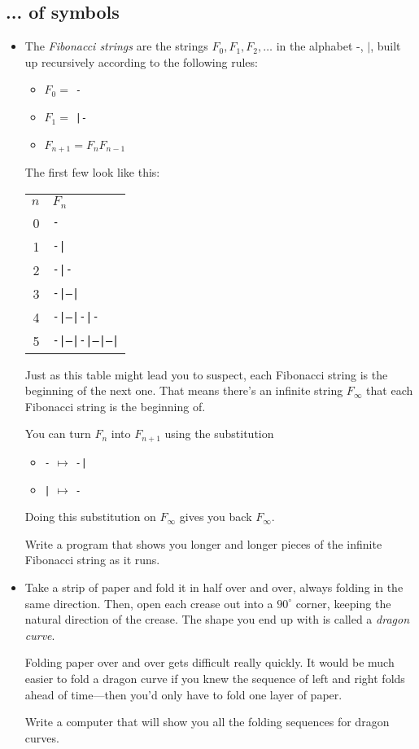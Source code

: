 \documentclass{article}
\newcommand*{\writeit}{\item[\NibRight]}
\newcommand{\str}[1]{\texttt{#1}}
\begin{document}
\subsection*{... of symbols}
\begin{itemize}
\writeit
The {\em Fibonacci strings} are the strings $F_0, F_1, F_2, \ldots$ in the alphabet $\str{-}$, $\str{|}$, built up recursively according to the following rules:
\begin{itemize}
\item[] $F_0 =$ \str{-}
\item[] $F_1 =$ \str{|-}
\item[] $F_{n + 1} = F_n F_{n - 1}$
\end{itemize}
The first few look like this:
\begin{center}
\begin{tabular}{rl}
$n$ & $F_n$ \\
0 & \str{-} \\
1 & \str{-|} \\
2 & \str{-|-} \\
3 & \str{-|--|} \\
4 & \str{-|--|-|-} \\
5 & \str{-|--|-|--|--|}
\end{tabular}
\end{center}
Just as this table might lead you to suspect, each Fibonacci string is the beginning of the next one. That means there's an infinite string $F_\infty$ that each Fibonacci string is the beginning of.

You can turn $F_n$ into $F_{n + 1}$ using the substitution
\begin{itemize}
\item[] \str{-} $\mapsto$ \str{-|}
\item[] \str{|} $\mapsto$ \str{-}
\end{itemize}
Doing this substitution on $F_\infty$ gives you back $F_\infty$.

Write a program that shows you longer and longer pieces of the infinite Fibonacci string as it runs.
\writeit
Take a strip of paper and fold it in half over and over, always folding in the same direction. Then, open each crease out into a $90^\circ$ corner, keeping the natural direction of the crease. The shape you end up with is called a {\em dragon curve}.

Folding paper over and over gets difficult really quickly. It would be much easier to fold a dragon curve if you knew the sequence of left and right folds ahead of time---then you'd only have to fold one layer of paper.

Write a computer that will show you all the folding sequences for dragon curves.
\end{itemize}
\end{document}
